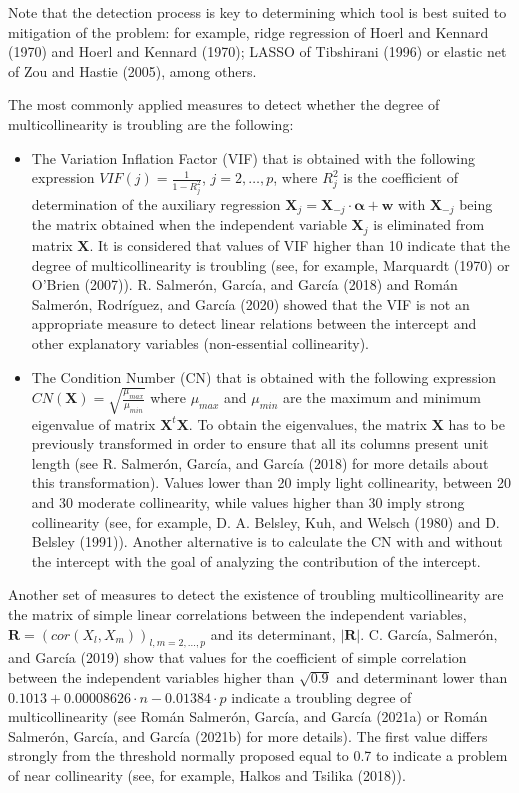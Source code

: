 Note that the detection process is key to determining which tool is best suited to mitigation of the problem: for example, ridge regression of Hoerl and Kennard (1970) and Hoerl and Kennard (1970); LASSO of Tibshirani (1996) or elastic net of Zou and Hastie (2005), among others.

The most commonly applied measures to detect whether the degree of multicollinearity is troubling are the following:

\begin{itemize}
\tightlist
\item
  The Variation Inflation Factor (VIF) that is obtained with the following expression \(VIF(j) = \frac{1}{1-R_{j}^{2}}\), \(j=2,\dots,p\), where \(R_{j}^{2}\) is the coefficient of determination of the auxiliary regression \(\mathbf{X}_{j} = \mathbf{X}_{-j} \cdot \boldsymbol{\alpha} + \mathbf{w}\) with \(\mathbf{X}_{-j}\) being the matrix obtained when the independent variable \(\mathbf{X}_{j}\) is eliminated from matrix \(\mathbf{X}\). It is considered that values of VIF higher than 10 indicate that the degree of multicollinearity is troubling (see, for example, Marquardt (1970) or O'Brien (2007)). R. Salmerón, García, and García (2018) and Román Salmerón, Rodríguez, and García (2020) showed that the VIF is not an appropriate measure to detect linear relations between the intercept and other explanatory variables (non-essential collinearity).
\item
  The Condition Number (CN) that is obtained with the following expression \(CN(\mathbf{X}) = \sqrt{\frac{\mu_{max}}{\mu_{min}}}\) where \(\mu_{max}\) and \(\mu_{min}\) are the maximum and minimum eigenvalue of matrix \(\mathbf{X}^{t} \mathbf{X}\). To obtain the eigenvalues, the matrix \(\mathbf{X}\) has to be previously transformed in order to ensure that all its columns present unit length (see R. Salmerón, García, and García (2018) for more details about this transformation). Values lower than 20 imply light collinearity, between 20 and 30 moderate collinearity, while values higher than 30 imply strong collinearity (see, for example, D. A. Belsley, Kuh, and Welsch (1980) and D. Belsley (1991)).
  Another alternative is to calculate the CN with and without the intercept with the goal of analyzing the contribution of the intercept.
\end{itemize}

Another set of measures to detect the existence of troubling multicollinearity are the matrix of simple linear correlations between the independent variables, \(\mathbf{R} = \left( cor(X_{l}, X_{m}) \right)_{l,m=2,\dots,p}\) and its determinant, \(| \mathbf{R} |\).
C. García, Salmerón, and García (2019) show that values for the coefficient of simple correlation between the independent variables higher than \(\sqrt{0.9}\) and determinant lower than \(0.1013 + 0.00008626 \cdot n - 0.01384 \cdot p\) indicate a troubling degree of multicollinearity (see Román Salmerón, García, and García (2021a) or Román Salmerón, García, and García (2021b) for more details).
The first value differs strongly from the threshold normally proposed equal to 0.7 to indicate a problem of near collinearity (see, for example, Halkos and Tsilika (2018)).

